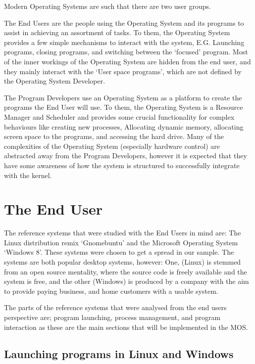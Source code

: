 \documentclass[a4paper]{report}
\begin{document}
Modern Operating Systems are such that there are two user groups.


The End Users are the people using the Operating System and its programs to assist in achieving an assortment of tasks. To them, the Operating System provides a few simple mechanisms to interact with the system, E.G. Launching programs, closing programs, and switching between the `focused' program. Most of the inner workings of the Operating System are hidden from the end user, and they mainly interact with the `User space programs', which are not defined by the Operating System Developer.


The Program Developers use an Operating System as a platform to create the programs the End User will use. To them, the Operating System is a Resource Manager and Scheduler and provides some crucial functionality for complex behaviours like creating new processes, Allocating dynamic memory, allocating screen space to the programs, and accessing the hard drive. Many of the complexities of the Operating System (especially hardware control) are abstracted away from the Program Developers, however it is expected that they have some awareness of how the system is structured to successfully integrate with the kernel.






\clearpage
\section{The End User}
The reference systems that were studied with the End Users in mind are: The Linux distribution remix `Gnomebuntu' and the Microsoft Operating System `Windows 8'. These systems were chosen to get a spread in our sample. The systems are both popular desktop systems, however: One, (Linux) is stemmed from an open source mentality, where the source code is freely available and the system is free, and the other (Windows) is produced by a company with the aim to provide paying business, and home customers with a usable system.

The parts of the reference systems that were analysed from the end users perspective are; program launching, process management, and program interaction as these are the main sections that will be implemented in the MOS.

\subsection{Launching programs in Linux and Windows}
\end{document}
